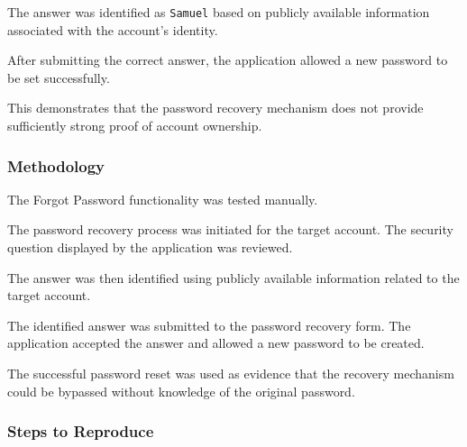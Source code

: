 The answer was identified as \texttt{Samuel} based on publicly
available information associated with the account's identity.

After submitting the correct answer, the application allowed a new
password to be set successfully.

This demonstrates that the password recovery mechanism does not
provide sufficiently strong proof of account ownership.

\subsubsection*{Methodology}

The Forgot Password functionality was tested manually.

The password recovery process was initiated for the target account.
The security question displayed by the application was reviewed.

The answer was then identified using publicly available information
related to the target account.

The identified answer was submitted to the password recovery form.
The application accepted the answer and allowed a new password to be
created.

The successful password reset was used as evidence that the recovery
mechanism could be bypassed without knowledge of the original
password.

\subsubsection*{Steps to Reproduce}

